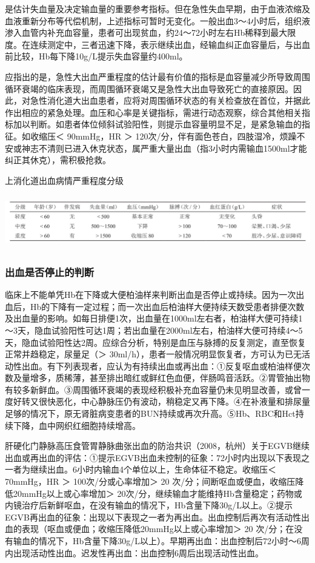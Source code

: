 是估计失血量及决定输血量的重要参考指标。但在急性失血早期，由于血液浓缩及血液重新分布等代偿机制，上述指标可暂时无变化。一般出血3～4小时后，组织液渗入血管内补充血容量，患者可出现贫血，约24～72小时左右Hb稀释到最大限度。在连续测定中，三者迅速下降，表示继续出血，经输血纠正血容量后，与出血前比较，Hb每下降10g/L提示失血容量约400ml。

应指出的是，急性大出血严重程度的估计最有价值的指标是血容量减少所导致周围循环衰竭的临床表现，而周围循环衰竭又是急性大出血导致死亡的直接原因。因此，对急性消化道大出血患者，应将对周围循环状态的有关检查放在首位，并据此作出相应的紧急处理。血压和心率是关键指标，需进行动态观察，综合其他相关指标加以判断。如患者体位倾斜试验阳性，则提示血容量明显不足，是紧急输血的指征。如收缩压＜
90mmHg，HR ＞
120次/分，伴有面色苍白，四肢湿冷，烦躁不安或神志不清则已进入休克状态，属严重大量出血（指3小时内需输血1500ml才能纠正其休克），需积极抢救。

\begin{table}[htbp]
\centering
\caption{上消化道出血病情严重程度分级}
\label{tab13-2}
\includegraphics[width=6.65625in,height=0.91667in]{./images/Image00054.jpg}
\end{table}

\subsubsection{出血是否停止的判断}

临床上不能单凭Hb在下降或大便柏油样来判断出血是否停止或持续。因为一次出血后，Hb的下降有一定过程；而一次出血后柏油样大便持续天数受患者排便次数及出血量的影响。如每日排便1次，出血量在1000ml左右者，柏油样大便可持续1～3天，隐血试验阳性可达1周；若出血量在2000ml左右，柏油样大便可持续4～5天，隐血试验阳性达2周。应综合分析，特别是血压与脉搏的反复测定，直至恢复正常并趋稳定，尿量足（＞
30ml/h），患者一般情况明显恢复者，方可认为已无活动性出血。有下列表现者，应认为有持续出血或再出血：①反复呕血或柏油样便次数及量增多，质稀薄，甚至排出暗红或鲜红色血便，伴肠鸣音活跃。②胃管抽出物有较多新鲜血。③周围循环衰竭的表现经积极补充血容量仍未见明显改善，或曾一度好转又很快恶化，中心静脉压仍有波动，稍稳定又再下降。④在补液量和排尿量足够的情况下，原无肾脏病变患者的BUN持续或再次升高。⑤Hb、RBC和Hct持续下降，血中网织红细胞持续增高。

肝硬化门静脉高压食管胃静脉曲张出血的防治共识（2008，杭州）关于EGVB继续出血或再出血的评估：①提示EGVB出血未控制的征象：72小时内出现以下表现之一者为继续出血。6小时内输血4个单位以上，生命体征不稳定。收缩压＜
70mmHg，HR ＞ 100次/分或心率增加＞ 20
次/分；间断呕血或便血，收缩压降低20mmHg以上或心率增加＞
20次/分，继续输血才能维持Hb含量稳定；药物或内镜治疗后新鲜呕血，在没有输血的情况下，Hb含量下降30g/L以上。②提示EGVB再出血的征象：出现以下表现之一者为再出血。出血控制后再次有活动性出血的表现（呕血或便血；收缩压降低20mmHg以上或心率增加＞
20
次/分；在没有输血的情况下，Hb含量下降30g/L以上）。早期再出血：出血控制后72小时～6周内出现活动性出血。迟发性再出血：出血控制6周后出现活动性出血。


